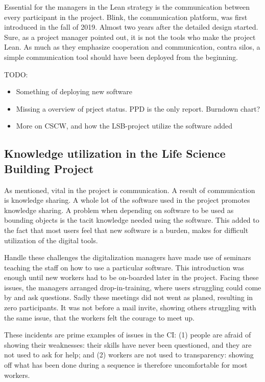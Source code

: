 Essential for the managers in the Lean strategy is the communication between every participant in the project. Blink, the communication platform, was first introduced in the fall of 2019. Almost two years after the detailed design started. Sure, as a project manager pointed out, it is not the tools who make the project Lean. As much as they emphasize cooperation and communication, contra silos, a simple communication tool should have been deployed from the beginning.

TODO: 
\begin{itemize}
    \item Something of deploying new software
    \item Missing a overview of prject status. PPD is the only report. Burndown chart?
    \item More on CSCW, and how the LSB-project utilize the software added
\end{itemize}


\subsection{Knowledge utilization in the Life Science Building Project}
As mentioned, vital in the project is communication. A result of communication is knowledge sharing. A whole lot of the software used in the project promotes knowledge sharing. A problem when depending on software to be used as bounding objects is the tacit knowledge needed using the software. This added to the fact that most users feel that new software is a burden, makes for difficult utilization of the digital tools.   

Handle these challenges the digitalization managers have made use of seminars teaching the staff on how to use a particular software. This introduction was enough until new workers had to be on-boarded later in the project. Facing these issues, the managers arranged drop-in-training, where users struggling could come by and ask questions. Sadly these meetings did not went as planed, resulting in zero participants. It was not before a mail invite, showing others struggling with the same issue, that the workers felt the courage to meet up. 

These incidents are prime examples of issues in the CI: (1) people are afraid of showing their weaknesses: their skills have never been questioned, and they are not used to ask for help; and (2) workers are not used to transparency: showing off what has been done during a sequence is therefore uncomfortable for most workers. 

